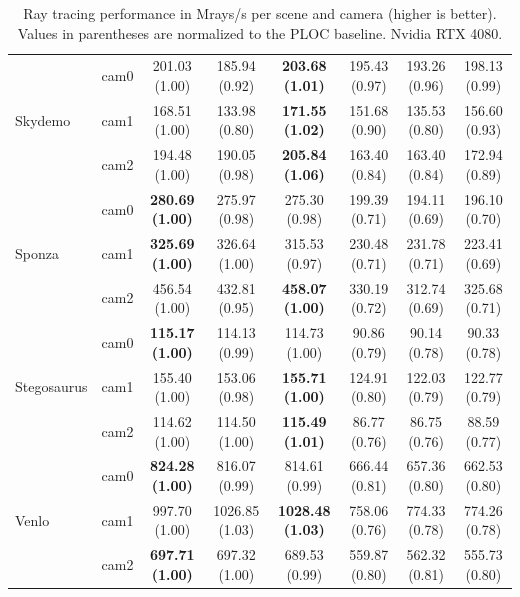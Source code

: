 \begin{table}[!ht]
{\begin{tabular}{llcccccc}
        \hline
        \multirow{3}{*}{Skydemo}
        & cam0 & 201.03 (1.00) & 185.94 (0.92) & \textbf{203.68 (1.01)} & 195.43 (0.97) & 193.26 (0.96) & 198.13 (0.99) \\
        & cam1 & 168.51 (1.00) & 133.98 (0.80) & \textbf{171.55 (1.02)} & 151.68 (0.90) & 135.53 (0.80) & 156.60 (0.93) \\
        & cam2 & 194.48 (1.00) & 190.05 (0.98) & \textbf{205.84 (1.06)} & 163.40 (0.84) & 163.40 (0.84) & 172.94 (0.89) \\

        \hline
        \multirow{3}{*}{Sponza}
        & cam0 & \textbf{280.69 (1.00)} & 275.97 (0.98) & 275.30 (0.98) & 199.39 (0.71) & 194.11 (0.69) & 196.10 (0.70) \\
        & cam1 & \textbf{325.69 (1.00)} & 326.64 (1.00) & 315.53 (0.97) & 230.48 (0.71) & 231.78 (0.71) & 223.41 (0.69) \\
        & cam2 & 456.54 (1.00) & 432.81 (0.95) & \textbf{458.07 (1.00)} & 330.19 (0.72) & 312.74 (0.69) & 325.68 (0.71) \\

        \hline
        \multirow{3}{*}{Stegosaurus}
        & cam0 & \textbf{115.17 (1.00)} & 114.13 (0.99) & 114.73 (1.00) & 90.86 (0.79) & 90.14 (0.78) & 90.33 (0.78) \\
        & cam1 & 155.40 (1.00) & 153.06 (0.98) & \textbf{155.71 (1.00)} & 124.91 (0.80) & 122.03 (0.79) & 122.77 (0.79) \\
        & cam2 & 114.62 (1.00) & 114.50 (1.00) & \textbf{115.49 (1.01)} & 86.77 (0.76) & 86.75 (0.76) & 88.59 (0.77) \\

        \hline
        \multirow{3}{*}{Venlo}
        & cam0 & \textbf{824.28 (1.00)} & 816.07 (0.99) & 814.61 (0.99) & 666.44 (0.81) & 657.36 (0.80) & 662.53 (0.80) \\
        & cam1 & 997.70 (1.00) & 1026.85 (1.03) & \textbf{1028.48 (1.03)} & 758.06 (0.76) & 774.33 (0.78) & 774.26 (0.78) \\
        & cam2 & \textbf{697.71 (1.00)} & 697.32 (1.00) & 689.53 (0.99) & 559.87 (0.80) & 562.32 (0.81) & 555.73 (0.80) \\

        \hline
    \end{tabular}
    }
    \caption{Ray tracing performance in Mrays/s per scene and camera (higher is better). Values in parentheses are normalized to the PLOC baseline. Nvidia RTX 4080.}
    \label{tab:trace-performance-cameras-4080}
\end{table}

